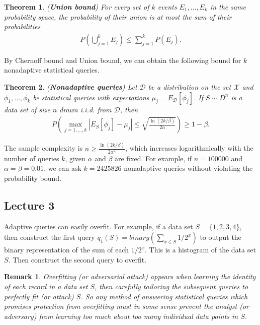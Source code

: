 \documentclass[]{article}
\newtheorem{theorem}{Theorem}[section]
\newtheorem{remark}{Remark}[section]
\begin{document}
\begin{theorem} (\textbf{Union bound})
	For every set of $k$ events $E_1, \dots, E_k$ in the same probability space, the probability of their union is at most the sum of their probabilities 
	\begin{align*}
		P\left(\bigcup_{j=1}^k E_j\right) \le \sum_{j=1}^k P(E_j).
	\end{align*}
\end{theorem}

By Chernoff bound and Union bound, we can obtain the following bound for $k$ nonadaptive statistical queries.

\begin{theorem} (\textbf{Nonadaptive queries})
	\label{theorem:nonadaptive queries}
	Let $\mathcal{D}$ be a distribution on the set $\mathcal{X}$ and $\phi_1, \dots, \phi_k$ be statistical queries with expectations $\mu_j=E_{\mathcal{D}}[\phi_j]$. If $S \sim D^n$ is a data set of size $n$ drawn i.i.d. from $\mathcal{D}$, then 
	\begin{align*}
		P\left(\max_{j=1,\dots,k}|E_S[\phi_j] - \mu_j| \le \sqrt{\frac{\ln(2k/\beta)}{2n}} \right) \ge 1 - \beta.
	\end{align*}
\end{theorem}

The sample complexity is $n \ge \frac{\ln (2k/\beta)}{2\alpha^2}$, which increases logarithmically with the number of queries $k$, given $\alpha$ and $\beta$ are fixed. For example, if $n=100000$ and $\alpha=\beta=0.01$, we can ask $k=2425826$ nonadaptive queries without violating the probability bound. 

\subsection{Lecture 3}
Adaptive queries can easily overfit. For example, if a data set $S = \{1,2,3,4\}$, then construct the first query $q_1(S) = binary(\sum_{x \in S}1/2^x)$ to output the binary representation of the sum of each $1/2^x$. This is a histogram of the data set $S$. Then construct the second query to overfit. 

\begin{remark}
	Overfitting (or adversarial attack) appears when learning the identity of each record in a data set $S$, then carefully tailoring the subsequent queries to perfectly fit (or attack) $S$. So any method of answering statistical queries which promises protection from overfitting must in some sense prevent the analyst (or adversary) from learning too much about too many individual data points in $S$. 
\end{remark}
\end{document}
